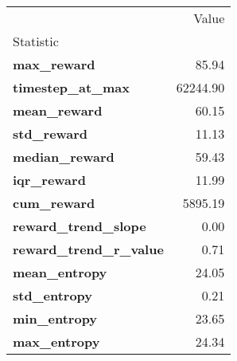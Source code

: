\begin{tabular}{lr}
\toprule
 & Value \\
Statistic &  \\
\midrule
\textbf{max\_reward} & 85.94 \\
\textbf{timestep\_at\_max} & 62244.90 \\
\textbf{mean\_reward} & 60.15 \\
\textbf{std\_reward} & 11.13 \\
\textbf{median\_reward} & 59.43 \\
\textbf{iqr\_reward} & 11.99 \\
\textbf{cum\_reward} & 5895.19 \\
\textbf{reward\_trend\_slope} & 0.00 \\
\textbf{reward\_trend\_r\_value} & 0.71 \\
\textbf{mean\_entropy} & 24.05 \\
\textbf{std\_entropy} & 0.21 \\
\textbf{min\_entropy} & 23.65 \\
\textbf{max\_entropy} & 24.34 \\
\bottomrule
\end{tabular}
